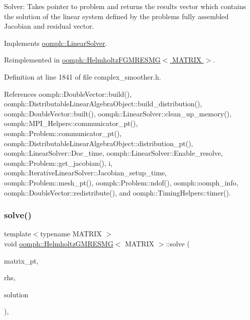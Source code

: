 Solver\+: Takes pointer to problem and returns the results vector which contains the solution of the linear system defined by the problem\textquotesingle{}s fully assembled Jacobian and residual vector. 



Implements \hyperlink{classoomph_1_1LinearSolver_a15ce22542b74ed1826ea485edacbeb6e}{oomph\+::\+Linear\+Solver}.



Reimplemented in \hyperlink{classoomph_1_1HelmholtzFGMRESMG_a36a1d601676df2ebe39fcdb7a0837864}{oomph\+::\+Helmholtz\+F\+G\+M\+R\+E\+S\+M\+G$<$ M\+A\+T\+R\+I\+X $>$}.



Definition at line 1841 of file complex\+\_\+smoother.\+h.



References oomph\+::\+Double\+Vector\+::build(), oomph\+::\+Distributable\+Linear\+Algebra\+Object\+::build\+\_\+distribution(), oomph\+::\+Double\+Vector\+::built(), oomph\+::\+Linear\+Solver\+::clean\+\_\+up\+\_\+memory(), oomph\+::\+M\+P\+I\+\_\+\+Helpers\+::communicator\+\_\+pt(), oomph\+::\+Problem\+::communicator\+\_\+pt(), oomph\+::\+Distributable\+Linear\+Algebra\+Object\+::distribution\+\_\+pt(), oomph\+::\+Linear\+Solver\+::\+Doc\+\_\+time, oomph\+::\+Linear\+Solver\+::\+Enable\+\_\+resolve, oomph\+::\+Problem\+::get\+\_\+jacobian(), i, oomph\+::\+Iterative\+Linear\+Solver\+::\+Jacobian\+\_\+setup\+\_\+time, oomph\+::\+Problem\+::mesh\+\_\+pt(), oomph\+::\+Problem\+::ndof(), oomph\+::oomph\+\_\+info, oomph\+::\+Double\+Vector\+::redistribute(), and oomph\+::\+Timing\+Helpers\+::timer().

\mbox{\label{classoomph_1_1HelmholtzGMRESMG_a3e6405af2506c7b789ba3208d0a9cf6d}} 
\subsubsection{\texorpdfstring{solve()}{solve()}\hspace{0.1cm}{\footnotesize\ttfamily [2/3]}}
{\footnotesize\ttfamily template$<$typename M\+A\+T\+R\+IX $>$ \\
void \hyperlink{classoomph_1_1HelmholtzGMRESMG}{oomph\+::\+Helmholtz\+G\+M\+R\+E\+S\+MG}$<$ M\+A\+T\+R\+IX $>$\+::solve (\begin{DoxyParamCaption}\item[{\hyperlink{classoomph_1_1DoubleMatrixBase}{Double\+Matrix\+Base} $\ast$const \&}]{matrix\+\_\+pt,  }\item[{const \hyperlink{classoomph_1_1DoubleVector}{Double\+Vector} \&}]{rhs,  }\item[{\hyperlink{classoomph_1_1DoubleVector}{Double\+Vector} \&}]{solution }\end{DoxyParamCaption})\hspace{0.3cm}{\ttfamily [inline]}, {\ttfamily [virtual]}}



